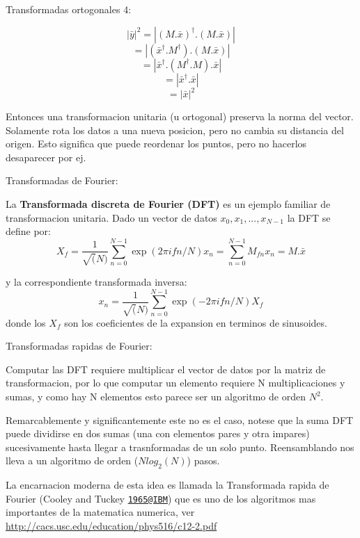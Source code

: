 \documentclass[ignorenonframetext,]{beamer}
\begin{document}
\begin{frame}

\begin{block}{Transformadas ortogonales 4:}

\[|\bar{y}|^{2}=|(M.\bar{x})^{\dagger}.(M.\bar{x})|\]
\[             =|(\bar{x}^{\dagger}.M^{\dagger}).(M.\bar{x})|\]
\[             =|\bar{x}^{\dagger}.(M^{\dagger}.M).\bar{x}|\]
\[             =|\bar{x}^{\dagger}.\bar{x}|\]
\[             =|\bar{x}|^{2}\]

Entonces una transformacion unitaria (u ortogonal) preserva la norma del
vector. Solamente rota los datos a una nueva posicion, pero no cambia su
distancia del origen. Esto significa que puede reordenar los puntos,
pero no hacerlos desaparecer por ej.

\end{block}

\end{frame}

\begin{frame}

\begin{block}{Transformadas de Fourier:}

La \textbf{Transformada discreta de Fourier (DFT)} es un ejemplo
familiar de transformacion unitaria. Dado un vector de datos
\({x_{0}, x_{1},...,x_{N-1}}\) la DFT se define por:
\[X_{f}=\frac{1}{\sqrt(N)}\sum_{n=0}^{N-1} \exp(2\pi i f n/N
) x_{n}=\sum_{n=0}^{N-1} M_{fn} x_{n}=M.\bar{x}\]

y la correspondiente transformada inversa:
\[x_{n}=\frac{1}{\sqrt(N)}\sum_{n=0}^{N-1} \exp(-2 \pi i f n/N) X_{f
}\] donde los \(X_{f}\) son los coeficientes de la expansion en terminos
de sinusoides.

\end{block}

\end{frame}

\begin{frame}

\begin{block}{Transformadas rapidas de Fourier:}

Computar las DFT requiere multiplicar el vector de datos por la matriz
de transformacion, por lo que computar un elemento requiere N
multiplicaciones y sumas, y como hay N elementos esto parece ser un
algoritmo de orden \(N^2\).

Remarcablemente y significantemente este no es el caso, notese que la
suma DFT puede dividirse en dos sumas (una con elementos pares y otra
impares) sucesivamente hasta llegar a trasnformadas de un solo punto.
Reensamblando nos lleva a un algoritmo de orden (\(N log_{2}(N)\))
pasos.

La encarnacion moderna de esta idea es llamada la Transformada rapida de
Fourier (Cooley and Tuckey \href{mailto:1965@IBM}{\nolinkurl{1965@IBM}})
que es uno de los algoritmos mas importantes de la matematica numerica,
ver \url{http://cacs.usc.edu/education/phys516/c12-2.pdf}

\end{block}

\end{frame}
\end{document}
